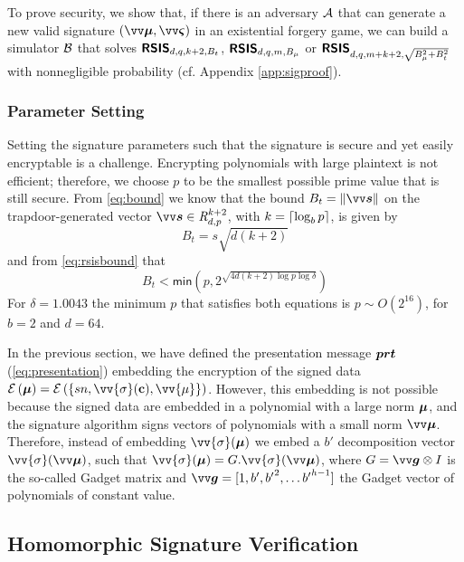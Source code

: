 To prove security, we show that, if there is an adversary $\mathcal{A}$ that can generate a new valid signature $(\pv{\mu},\pv{\varsigma})$ in an existential forgery game, we can build a simulator $\mathcal{B}$ that solves $\textsf{\textbf{RSIS}}_{d,q,k+2,B_t}$, $\textsf{\textbf{RSIS}}_{d,q,m,B_{\mu}}$ or $\textsf{\textbf{RSIS}}_{d,q,m+k+2,\sqrt{B_{\mu}^2+B_t^2}}$ with nonnegligible probability (cf. Appendix \ref{app:sigproof}).
\subsubsection{Parameter Setting}

Setting the signature parameters such that the signature is secure and yet easily encryptable is a challenge. Encrypting polynomials with large plaintext is not efficient; therefore, we choose $p$ to be the smallest possible prime value that is still secure. From \cref{eq:bound} we know that the bound $B_t=\|\pv{s}\|$ on the trapdoor-generated vector $\pv{s}\in \intring_{d,p}^{k+2}$, with $k=\left\lceil \log_b{p} \right\rceil$, is given by
\begin{equation}\label{eq:sbound}
B_t = s\sqrt{d(k+2)}   
\end{equation}
and from \cref{eq:rsisbound} that
\begin{equation}\label{eq:sboundrsis}
B_t < \textsf{min}(p,2^{\sqrt{4d(k+2)\log{p}\log{\delta}}})    
\end{equation}
For $\delta=1.0043$ the minimum $p$ that satisfies both equations is $p\sim O(2^{16})$, for $b=2$ and $d=64$.

In the previous section, we have defined the presentation message $\bm{prt}$ (\cref{eq:presentation}) embedding the encryption of the signed data
$\enc{\p{\mu}}=\enc{\{sn,\vv{\sigma}(\pc),\vv{\mu}\}}$. However, this embedding is not possible because the signed data are embedded in a polynomial with a large norm $\bm{\mu}$, and the signature algorithm signs vectors of polynomials with a small norm $\pv{\mu}$. Therefore, instead of embedding $\vv{\sigma}(\p{\mu})$ we embed a $b'$ decomposition vector $\vv{\sigma}(\pv{\mu})$, such that $\vv{\sigma}(\p{\mu}) = G.\vv{\sigma}(\pv{\mu})$, where $G=\pv{g}\otimes I$ is the so-called Gadget matrix and $\pv{g}=[1, b', {b'}^2, \ldots {b'}^{h-1}]$ the Gadget vector of polynomials of constant value. 

\subsection{Homomorphic Signature Verification}


